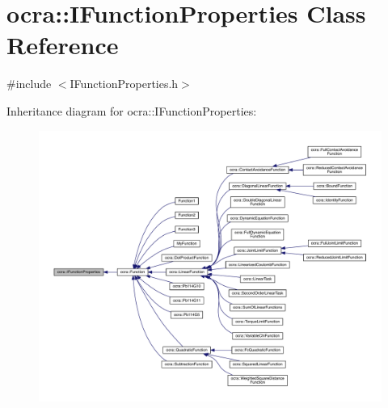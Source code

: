 \hypertarget{classocra_1_1IFunctionProperties}{}\section{ocra\+:\+:I\+Function\+Properties Class Reference}
\label{classocra_1_1IFunctionProperties}


{\ttfamily \#include $<$I\+Function\+Properties.\+h$>$}



Inheritance diagram for ocra\+:\+:I\+Function\+Properties\+:\nopagebreak
\begin{figure}[H]
\begin{center}
\leavevmode
\includegraphics[width=350pt]{d3/db7/classocra_1_1IFunctionProperties__inherit__graph}
\end{center}
\end{figure}
